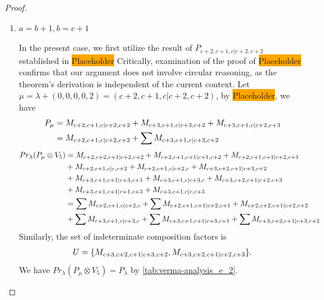 \begin{proof}
\begin{enumerate}
\begin{enumerate}
        \item $a=b+1,b=c+1$ \par
        In the present case, we first utilize the result of $P_{c+2,c+1,c|c+2,c+2}$ established in \colorbox{orange}{Placeholder} Critically, examination of the proof of \colorbox{orange}{Placeholder} confirms that our argument does not involve circular reasoning, as the theorem's derivation is independent of the current context. Let $\mu = \lambda + (0,0,0,0,2) =(c+2,c+1,c|c+2,c+2) $, by \colorbox{orange}{Placeholder}, we have
        \begin{equation}\notag
          \begin{aligned}
            P_\mu &= 
M_{c+2,c+1,c|c+2,c+2}
+M_{c+3,c+1,c|c+3,c+2}
+M_{c+3,c+1,c|c+2,c+3} \\
                  &=
 M_{c+2,c+1,c|c+2,c+2}
+\sum M_{c+3,c+1,c|c+3,c+2}
          \end{aligned}
        \end{equation}
        \begin{equation}\notag
          \begin{aligned}
            Pr_{\lambda}(P_\mu \otimes V_{5}) &=
M_{c+2,c+2,c+1|c+2,c+2}
+ M_{c+2,c+1,c+1|c+1,c+2}
+ M_{c+2,c+1,c+1|c+2,c+1}\\
                                              &
+ M_{c+2,c+1,c|c,c+2}
+ M_{c+2,c+1,c|c+2,c}
+ M_{c+3,c+2,c+1|c+3,c+2}\\
                                              &
+ M_{c+3,c+1,c+1|c+3,c+1}
+ M_{c+3,c+1,c|c+3,c}
+ M_{c+3,c+2,c+1|c+2,c+3}\\
                                              &
+ M_{c+3,c+1,c+1|c+1,c+3}
+ M_{c+3,c+1,c|c,c+3} \\
                                               &=
\sum M_{c+2,c+1,c|c+2,c}
+ \sum M_{c+2,c+1,c+1|c+2,c+1}
+  M_{c+2,c+2,c+1|c+2,c+2}\\
                                              &
+ \sum M_{c+3,c+1,c|c+3,c}
+ \sum M_{c+3,c+1,c+1|c+3,c+1}
+ \sum M_{c+3,c+2,c+1|c+3,c+2}
          \end{aligned}
        \end{equation}
      Similarly, the set of indeterminate composition factors is 
\begin{equation}\notag
  \begin{aligned}
    U = \{
M_{c+3,c+2,c+1|c+3,c+2},
M_{c+3,c+2,c+1|c+2,c+3}
\}.
  \end{aligned}
\end{equation}
       We have $Pr_{\lambda}(P_\mu \otimes V_{5}) = P_\lambda  $ by \cref{tab:verma-analysis_e_2}.

\end{enumerate}
\end{enumerate}
\end{proof}

